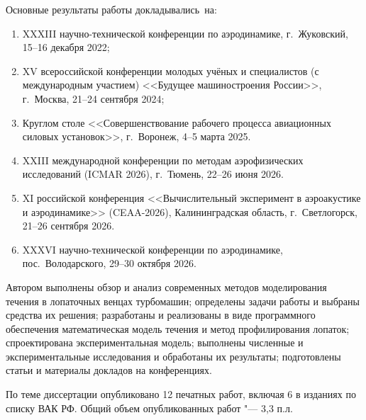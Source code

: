 {\probation}
Основные результаты работы докладывались~на:
\begin{enumerate}
	\item XXXIII научно-технической конференции по аэродинамике, г.~Жуковский, 15--16 декабря 2022;
	\item XV всероссийской конференции молодых учёных и специалистов (с международным участием) <<Будущее машиностроения России>>, г.~Москва, 21--24 сентября 2024;
	\item Круглом столе <<Совершенствование рабочего процесса авиационных силовых установок>>, г.~Воронеж, 4--5 марта 2025.
	\item XXIII международной конференции по методам аэрофизических исследований (ICMAR 2026), г.~Тюмень, 22--26 июня 2026.
	\item XI российской конференция <<Вычислительный эксперимент в аэроакустике и аэродинамике>> (CEAA-2026), Калининградская область, г.~Светлогорск, 21--26 сентября 2026.
	\item XXXVI научно-технической конференции по аэродинамике, пос.~Володарского, 29--30 октября 2026.
\end{enumerate}

{\contribution}
Автором выполнены обзор и анализ современных методов моделирования течения в лопаточных венцах турбомашин; определены задачи работы и выбраны средства их решения; разработаны и реализованы в виде программного обеспечения математическая модель течения и метод профилирования лопаток; спроектирована экспериментальная модель; выполнены численные и экспериментальные исследования и обработаны их результаты; подготовлены статьи и материалы докладов на конференциях.

{\publications}
По теме диссертации опубликовано 12 печатных работ, включая 6 в изданиях по списку ВАК РФ.
Общий объем опубликованных работ "--- 3,3 п.л.

